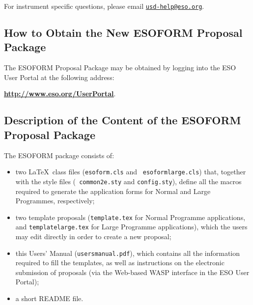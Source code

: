 \documentclass{article}
\begin{document}
For instrument specific questions,
please email \href{mailto:usd-help@eso.org}{\tt usd-help@eso.org}.


\subsection{How to Obtain the {\bf New ESOFORM} Proposal Package}

The ESOFORM Proposal Package may be obtained by logging into the ESO
User Portal at the following address:

\begin{center}
  \href{http://www.eso.org/UserPortal}{\bf
    \underline{http://www.eso.org/UserPortal}}. 
\end{center}


\subsection{Description of the Content of the ESOFORM Proposal
  Package}

\noindent The ESOFORM package consists of:
\begin{itemize}  
\item two \LaTeX\ class files ({\tt esoform.cls} and {\tt
    esoformlarge.cls}) that, together with the style files \linebreak ({\tt
    common2e.sty} and {\tt config.sty}), define
    all the macros required to generate the application forms for
    Normal and Large Programmes, respectively;
\item two template proposals ({\tt  template.tex} for Normal
    Programme applications, and  {\tt templatelarge.tex}  for  Large  Programme 
    applications), which the  users   may  edit directly in  order  to 
    create a new proposal;
\item this Users' Manual ({\tt usersmanual.pdf}), which contains all the 
    information  required to fill the templates, as well as
    instructions on the electronic submission of proposals (via the
    Web-based WASP interface in the ESO User Portal);

\item a short README file.
\end{itemize} 

\end{document}
